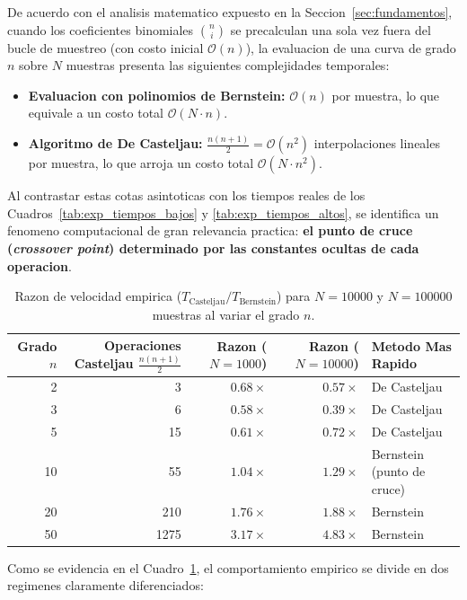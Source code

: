 De acuerdo con el analisis matematico expuesto en la Seccion~\ref{sec:fundamentos}, cuando los coeficientes binomiales $\binom{n}{i}$ se precalculan una sola vez fuera del bucle de muestreo (con costo inicial $\mathcal{O}(n)$), la evaluacion de una curva de grado $n$ sobre $N$ muestras presenta las siguientes complejidades temporales:

\begin{itemize}
    \item \textbf{Evaluacion con polinomios de Bernstein:} $\mathcal{O}(n)$ por muestra, lo que equivale a un costo total $\mathcal{O}(N \cdot n)$.
    \item \textbf{Algoritmo de De Casteljau:} $\frac{n(n+1)}{2} = \mathcal{O}(n^2)$ interpolaciones lineales por muestra, lo que arroja un costo total $\mathcal{O}(N \cdot n^2)$.
\end{itemize}

Al contrastar estas cotas asintoticas con los tiempos reales de los Cuadros~\ref{tab:exp_tiempos_bajos} y \ref{tab:exp_tiempos_altos}, se identifica un fenomeno computacional de gran relevancia practica: \textbf{el punto de cruce (\textit{crossover point}) determinado por las constantes ocultas de cada operacion}.

\begin{table}[H]
\centering
\caption{Razon de velocidad empirica ($T_{\text{Casteljau}} / T_{\text{Bernstein}}$) para $N = 10000$ y $N = 100000$ muestras al variar el grado $n$.}
\label{tab:comp_speedup}
\begin{tabular}{r rrr l}
\toprule
\textbf{Grado $n$} & \textbf{Operaciones Casteljau $\frac{n(n+1)}{2}$} & \textbf{Razon ($N=1000$)} & \textbf{Razon ($N=10000$)} & \textbf{Metodo Mas Rapido} \\
\midrule
2  & 3    & $0.68\times$ & $0.57\times$ & De Casteljau \\
3  & 6    & $0.58\times$ & $0.39\times$ & De Casteljau \\
5  & 15   & $0.61\times$ & $0.72\times$ & De Casteljau \\
10 & 55   & $1.04\times$ & $1.29\times$ & Bernstein (punto de cruce) \\
20 & 210  & $1.76\times$ & $1.88\times$ & Bernstein \\
50 & 1275 & $3.17\times$ & $4.83\times$ & Bernstein \\
\bottomrule
\end{tabular}
\end{table}

Como se evidencia en el Cuadro~\ref{tab:comp_speedup}, el comportamiento empirico se divide en dos regimenes claramente diferenciados:

